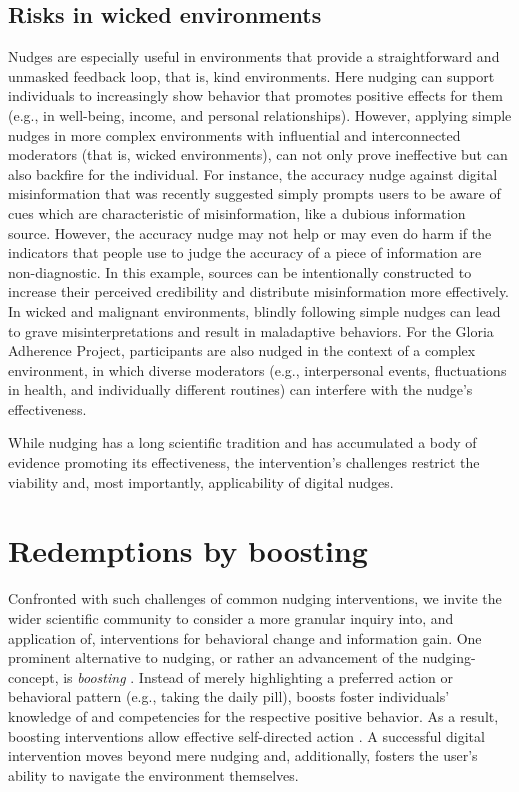 \documentclass[reflection, authordate]{jote-new-article}
\begin{document}
\subsection{Risks in wicked environments}



Nudges are especially useful in environments that provide a straightforward and unmasked feedback loop, that is, kind environments. Here nudging can support individuals to increasingly show behavior that promotes positive effects for them (e.g., in well-being, income, and personal relationships). However, applying simple nudges in more complex environments with influential and interconnected moderators (that is, wicked environments), can not only prove ineffective but can also backfire for the individual. For instance, the accuracy nudge against digital misinformation that was recently suggested \parencites[e.g.][]{Pennycook2021}{Lorenz-Spreen2021} simply prompts users to be aware of cues which are characteristic of misinformation, like a dubious information source. However, the accuracy nudge may not help or may even do harm if the indicators that people use to judge the accuracy of a piece of information are non-diagnostic. In this example, sources can be intentionally constructed to increase their perceived credibility and distribute misinformation more effectively. In wicked and malignant environments, blindly following simple nudges can lead to grave misinterpretations and result in maladaptive behaviors. For the Gloria Adherence Project, participants are also nudged in the context of a complex environment, in which diverse moderators (e.g., interpersonal events, fluctuations in health, and individually different routines) can interfere with the nudge’s effectiveness.



While nudging has a long scientific tradition and has accumulated a body of evidence promoting its effectiveness, the intervention’s challenges restrict the viability and, most importantly, applicability of digital nudges.



\section{Redemptions by boosting}



Confronted with such challenges of common nudging interventions, we invite the wider scientific community to consider a more granular inquiry into, and application of, interventions for behavioral change and information gain. One prominent alternative to nudging, or rather an advancement of the nudging-concept, is \emph{boosting} \parencites[e.g.][]{Hertwig2017}{Hertwig2017a}. Instead of merely highlighting a preferred action or behavioral pattern (e.g., taking the daily pill), boosts foster individuals’ knowledge of and competencies for the respective positive behavior. As a result, boosting interventions allow effective self-directed action \parencites[e.g.][]{Lorenz-Spreen2021}. A successful digital intervention moves beyond mere nudging and, additionally, fosters the user’s ability to navigate the environment themselves.
\end{document}
